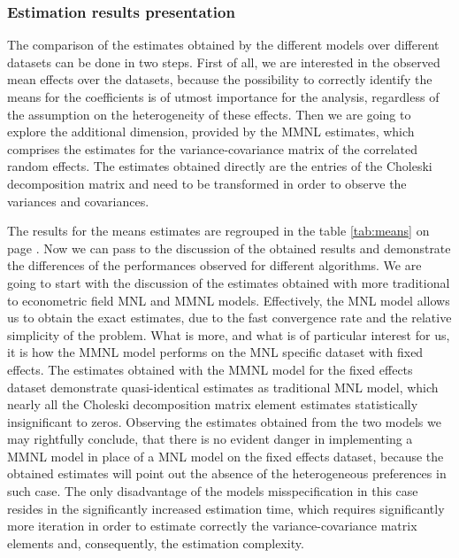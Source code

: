 \documentclass[11pt,]{article}
\begin{document}
\hypertarget{estimation-results-presentation}{%
\subsubsection{Estimation results
presentation}\label{estimation-results-presentation}}

The comparison of the estimates obtained by the different models over
different datasets can be done in two steps. First of all, we are
interested in the observed mean effects over the datasets, because the
possibility to correctly identify the means for the coefficients is of
utmost importance for the analysis, regardless of the assumption on the
heterogeneity of these effects. Then we are going to explore the
additional dimension, provided by the MMNL estimates, which comprises
the estimates for the variance-covariance matrix of the correlated
random effects. The estimates obtained directly are the entries of the
Choleski decomposition matrix and need to be transformed in order to
observe the variances and covariances.

The results for the means estimates are regrouped in the table
\ref{tab:means} on page \pageref{tab:means}. Now we can pass to the
discussion of the obtained results and demonstrate the differences of
the performances observed for different algorithms. We are going to
start with the discussion of the estimates obtained with more
traditional to econometric field MNL and MMNL models. Effectively, the
MNL model allows us to obtain the exact estimates, due to the fast
convergence rate and the relative simplicity of the problem. What is
more, and what is of particular interest for us, it is how the MMNL
model performs on the MNL specific dataset with fixed effects. The
estimates obtained with the MMNL model for the fixed effects dataset
demonstrate quasi-identical estimates as traditional MNL model, which
nearly all the Choleski decomposition matrix element estimates
statistically insignificant to zeros. Observing the estimates obtained
from the two models we may rightfully conclude, that there is no evident
danger in implementing a MMNL model in place of a MNL model on the fixed
effects dataset, because the obtained estimates will point out the
absence of the heterogeneous preferences in such case. The only
disadvantage of the models misspecification in this case resides in the
significantly increased estimation time, which requires significantly
more iteration in order to estimate correctly the variance-covariance
matrix elements and, consequently, the estimation complexity.
\end{document}
